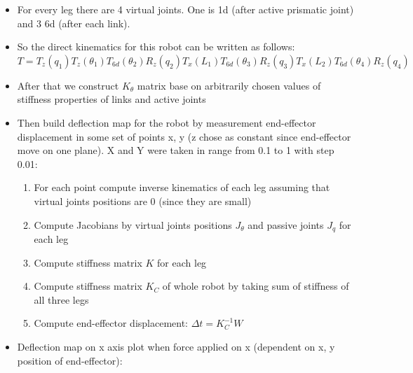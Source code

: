\documentclass[12pt]{article}
\begin{document}
\begin{itemize}
		\item For every leg there are 4 virtual joints. One is 1d (after active prismatic joint) and 3 6d (after each link).
		
		\item So the direct kinematics for this robot can be written as follows: \\
		\begin{math}
			T = T_{z}(q_1)T_{z}(\theta _{1})T_{6d}(\theta _{2})R_{z}(q_2)T_{x}(L_1)T_{6d}(\theta _3)R_z(q_3)T_x(L_2)T_{6d}(\theta _4)R_z(q_4)
		\end{math}
		
		\item After that we construct $K_\theta$ matrix base on arbitrarily chosen values of stiffness properties of links and active joints
		
		\item Then build deflection map for the robot by measurement end-effector displacement in some set of points x, y (z chose as constant since end-effector move on one plane). X and Y were taken in range from 0.1 to 1 with step 0.01:
		\begin{enumerate}
			\item For each point compute inverse kinematics of each leg assuming that virtual joints positions are 0 (since they are small)
			
			\item Compute Jacobians by virtual joints positions $J_\theta$ and passive joints $J_q$ for each leg
			
			\item Compute stiffness matrix $K$ for each leg
			
			\item Compute stiffness matrix $K_C$ of whole robot by taking sum of stiffness of all three legs
			
			\item Compute end-effector displacement: $\Delta t = K_C^{-1}W$
			
		\end{enumerate} 
		\item Deflection map on x axis plot when force applied on x (dependent on x, y position of end-effector): 
		

\end{itemize}
\end{document}
